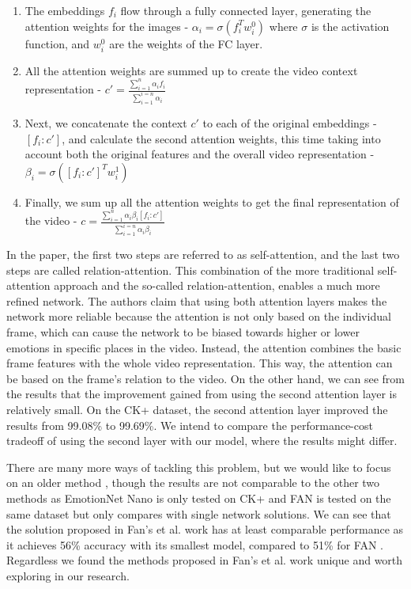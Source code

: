 \documentclass[../main.tex]{subfiles}
\begin{document}
\begin{samepage}
\begin{enumerate}[i]
    \item The embeddings $f_i$ flow through a fully connected layer, generating the attention weights for the images - $\alpha_i = \sigma(f_i^Tw_i^0)$
        where $\sigma$ is the activation function, and $w_i^0$ are the weights of the FC layer.
    \item All the attention weights are summed up to create the video context representation - $c'=\frac{\sum_{i=1}^{n}\alpha_if_i}{\sum_{i=1}^{i=n}\alpha_i}$
    \item Next, we concatenate the context $c'$ to each of the original embeddings - $[f_i:c']$, and calculate the second attention weights, this time 
        taking into account both the original features and the overall video representation - $\beta_i = \sigma([f_i:c']^Tw_i^1)$
    \item Finally, we sum up all the attention weights to get the final representation of the video - 
    $c = \frac{\sum_{i=1}^{n}\alpha_i\beta_i[f_i:c']}{\sum_{i=1}^{i=n}\alpha_i\beta_i}$
\end{enumerate}
\end{samepage}

In the paper, the first two steps are referred to as self-attention, and the last two steps are called relation-attention.
This combination of the more traditional self-attention approach and the so-called relation-attention, enables a much more refined network.
The authors claim that using both attention layers makes the network more reliable because the attention is not only based on the individual frame,
which can cause the network to be biased towards higher or lower emotions in specific places in the video. Instead, the attention combines the basic frame
features with the whole video representation. This way, the attention can be based on the frame's relation to the video.
On the other hand, we can see from the results that the improvement gained from using the second attention layer is relatively small. On the CK+ dataset,
the second attention layer improved the results from 99.08\% to 99.69\%. We intend to compare the performance-cost tradeoff of
using the second layer with our model, where the results might differ.
\par

There are many more ways of tackling this problem, but we would like to focus on an older method \cite{c3d},
though the results are not comparable to the other two methods as EmotionNet Nano \cite{emotionnet-nano} is only tested on CK+ and FAN \cite{fan}
is tested on the same dataset but only compares with single network solutions. We can see that the solution proposed in Fan's et al. work \cite{c3d}
has at least comparable performance as it achieves 56\% accuracy with its smallest model, compared to 51\% for FAN \cite{fan}.
Regardless we found the methods proposed in Fan's et al. work \cite{c3d} unique and worth exploring in our research.
\par
\end{document}
